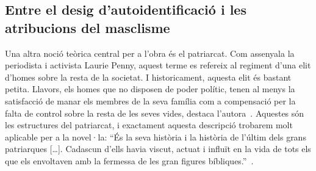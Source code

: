 \begin{comment}
--hier oder Unterkapitel "intertextualitaet" oder aehnlich in language

Qui es català?

* estereotips: die Mutter kann und tut nur putzen und kochen und ihren Mann gehorchen obwohl er sich ungeheuerlich verhaelt; der Vater ist richtig ueberzogen als Arsch dargestellt, der seine Familie schlaegt, rumvoegelt und absurde Vorstellungen von Ehre, Ehe und Familie hat;
--> vlt sind die stereotypen so überzogen um den inneren (und äußeren) konflikt noch drastischer hervorzuheben?
    vlt auch um ihre Absurdität aufzuzeigen?

"Jo hi volia anar, a veure Isabel [...] i així podria saber quina cara feia una dona com aquella. Lletja, segur. Havia de ser lletja i pudent, com havia dit la mare tantes vegades que eren les dones que mengen porc." (p.185)
--estereotips (dones cristianes, dones musulmanes, gegen einander ausgespielt)

"La mare sempre deia que hauries d'estar fent això o hauries d'estar fent allò altre i jo ja havia vist que les nenes de la meva edat no sabien ni agafar bé una escombra i que no tenien cap interès a aprendre'n." (p.239)
-- entre cultures: com són les amigues

\end{comment}

\subsection{Entre el desig d'autoidentificació i les atribucions del masclisme}

\begin{comment}
  1) autoidentificació
  buscant la seva identitat
  * religió
  * literatura

  2) les atribucions
  * com han de ser les nenes/les dones?
    ** alleine fuer die ganze care arbeit zustaendig, wird als natuerliche neigung inszeniert
  * les dones i les "altres" són culpables per tot (vgl Laurie Penny)
    --> keine Solidaritaet zwischen den Frauen (zb la mare i les amants) moeglich, obwohl sie alle Opfer sind; sie werden gegen einander ausgespielt
  * frauen werden auf ihr aeusseres reduziert
  * die frauen wuerden nie genuegen;
\end{comment}

Una altra noció teòrica central per a l'obra és el patriarcat.
Com assenyala la periodista i activista Laurie Penny, aquest terme es refereix al regiment d'una elit d'homes sobre la resta de la societat.
I historicament, aquesta elit és bastant petita.
Llavors, els homes que no disposen de poder polític, tenen al menys la satisfacció de manar els membres de la seva família com a compensació per la falta de control sobre la resta de les seves vides, destaca l'autora~\autocite[69-70]{Penny2014}.
Aquestes són les estructures del patriarcat, i exactament aquesta descripció trobarem molt aplicable per a la novel·la:
``És la seva història i la història de l'últim dels grans patriarques [\ldots]. Cadascun d'ells havia viscut, actuat i influït en la vida de tots els que els envoltaven amb la fermessa de les gran figures bíbliques.''~\autocite[7]{ElHachmi2008}.

